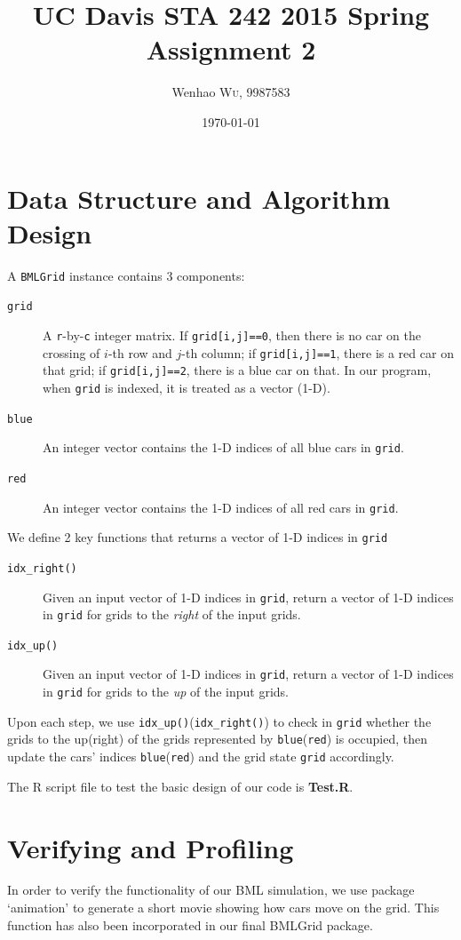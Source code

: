 \documentclass[twocolumn]{article}
\title{UC Davis STA 242 2015 Spring Assignment 2} %
\author{Wenhao \textsc{Wu}, 9987583} %
\date{\today} %
\begin{document}
\maketitle %


\section{Data Structure and Algorithm Design}
A \texttt{BMLGrid} instance contains 3 components:
\begin{description}
    \item[\texttt{grid}] A \texttt{r}-by-\texttt{c} integer matrix. If
    \texttt{grid[i,j]==0}, then there is no car on the crossing of $i$-th row
    and $j$-th column; if \texttt{grid[i,j]==1}, there is a red car on that
    grid; if \texttt{grid[i,j]==2}, there is a blue car on that. In our program,
    when \texttt{grid} is indexed, it is treated as a vector (1-D).
    \item[\texttt{blue}] An integer vector contains the 1-D indices of
    all blue cars in \texttt{grid}.
    \item[\texttt{red}] An integer vector contains the 1-D indices of
    all red cars in \texttt{grid}.
\end{description}
We define 2 key functions that returns a vector of 1-D
indices in \texttt{grid}
\begin{description}
    \item[\texttt{idx\_right()}] Given an input vector of 1-D indices in
    \texttt{grid}, return a vector of 1-D indices in \texttt{grid} for grids to
    the \emph{right} of the input grids.
    \item[\texttt{idx\_up()}] Given an input vector of 1-D indices in
    \texttt{grid}, return a vector of 1-D indices in \texttt{grid} for grids to
    the \emph{up} of the input grids.
\end{description}
Upon each step, we use \texttt{idx\_up()}(\texttt{idx\_right()}) to check in
\texttt{grid} whether the grids to the up(right) of the grids represented by
\texttt{blue}(\texttt{red}) is occupied, then update the cars' indices
\texttt{blue}(\texttt{red}) and the grid state \texttt{grid} accordingly.

The R script file to test the basic design of our code is \textbf{Test.R}.

\section{Verifying and Profiling}
In order to verify the functionality of our BML simulation, we use package
`animation' to generate a short movie showing how cars move on the grid. This
function has also been incorporated in our final BMLGrid package.
\end{document}
